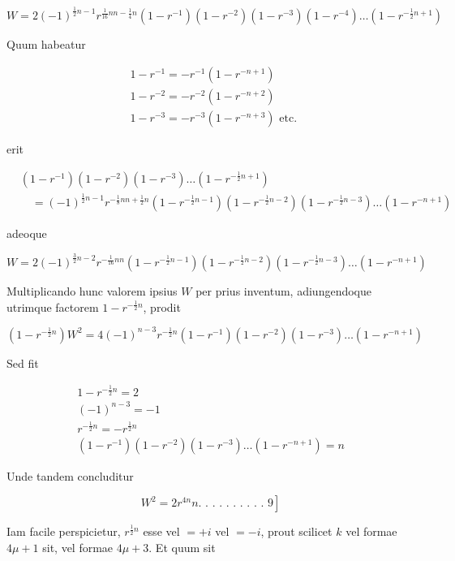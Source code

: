 \documentclass[10pt]{article}
\begin{document}
\[
W=2(-1)^{\frac{1}{2} n-1} r^{\frac{1}{16} n n-\frac{1}{4} n}\left(1-r^{-1}\right)\left(1-r^{-2}\right)\left(1-r^{-3}\right)\left(1-r^{-4}\right) \ldots\left(1-r^{-\frac{1}{2} n+1}\right)
\]

Quum habeatur

\[
\begin{aligned}
& 1-r^{-1}=-r^{-1}\left(1-r^{-n+1}\right) \\
& 1-r^{-2}=-r^{-2}\left(1-r^{-n+2}\right) \\
& 1-r^{-3}=-r^{-3}\left(1-r^{-n+3}\right) \text { etc. }
\end{aligned}
\]

erit

\[
\begin{aligned}
& \left(1-r^{-1}\right)\left(1-r^{-2}\right)\left(1-r^{-3}\right) \ldots\left(1-r^{-\frac{1}{2} n+1}\right) \\
& \quad=(-1)^{\frac{1}{2} n-1} r^{-\frac{1}{8} n n+\frac{1}{2} n}\left(1-r^{-\frac{1}{2} n-1}\right)\left(1-r^{-\frac{1}{2} n-2}\right)\left(1-r^{-\frac{1}{2} n-3}\right) \ldots\left(1-r^{-n+1}\right)
\end{aligned}
\]

adeoque

\[
W=2(-1)^{\frac{3}{2} n-2} r^{-\frac{1}{16} n n}\left(1-r^{-\frac{1}{2} n-1}\right)\left(1-r^{-\frac{1}{2} n-2}\right)\left(1-r^{-\frac{1}{2} n-3}\right) \ldots\left(1-r^{-n+1}\right)
\]

Multiplicando hunc valorem ipsius \(W\) per prius inventum, adiungendoque utrimque factorem \(1-r^{-\frac{1}{2} n}\), prodit

\[
\left(1-r^{-\frac{1}{2} n}\right) W^{2}=4(-1)^{n-3} r^{-\frac{1}{2} n}\left(1-r^{-1}\right)\left(1-r^{-2}\right)\left(1-r^{-3}\right) \ldots\left(1-r^{-n+1}\right)
\]

Sed fit

\[
\begin{gathered}
1-r^{-\frac{1}{2} n}=2 \\
(-1)^{n-3}=-1 \\
r^{-\frac{1}{2} n}=-r^{\frac{1}{2} n} \\
\left(1-r^{-1}\right)\left(1-r^{-2}\right)\left(1-r^{-3}\right) \ldots\left(1-r^{-n+1}\right)=n
\end{gathered}
\]

Unde tandem concluditur

\[
\left.W^{2}=2 r^{4 n} n \text {. . . . . . . . . . } 9\right]
\]

Iam facile perspicietur, \(r^{\frac{1}{2} n}\) esse vel \(=+i\) vel \(=-i\), prout scilicet \(k\) vel formae \(4 \mu+1\) sit, vel formae \(4 \mu+3\). Et quum sit
\end{document}
